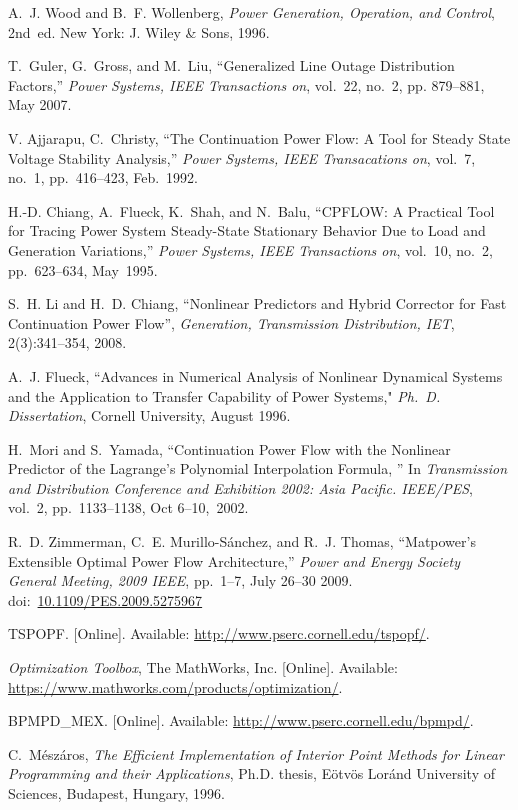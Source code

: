 \documentclass[12pt]{article}
\newcommand{\matpower}[0]{{\sc Matpower}}
\newcommand{\doi}[1]{doi:~\href{https://doi.org/#1}{#1}}
\numberwithin{equation}{section}
\numberwithin{table}{section}
\numberwithin{figure}{section}
\begin{document}
\begin{thebibliography}{99}
A.~J. Wood and B.~F. Wollenberg, \emph{Power Generation, Operation, and
  Control}, 2nd~ed. New York: J. Wiley \& Sons, 1996.

T.~Guler, G.~Gross, and M.~Liu, ``Generalized Line Outage Distribution
  Factors,'' \emph{Power Systems, IEEE Transactions on}, vol.~22, no.~2, pp.
  879--881, May 2007.

V. Ajjarapu, C.~Christy, ``The Continuation Power Flow: A Tool for Steady State Voltage Stability Analysis,'' \emph{Power Systems, IEEE Transacations on}, vol.~7, no.~1, pp.~416--423, Feb.~1992.

H.-D. Chiang, A.~Flueck, K.~Shah, and N.~Balu, ``CPFLOW:  A Practical Tool for Tracing Power System Steady-State Stationary Behavior Due to Load and Generation Variations,'' \emph{Power Systems, IEEE Transactions on}, vol.~10, no.~2, pp.~623--634, May~1995.

S.~H. Li and H.~D. Chiang, ``Nonlinear Predictors and Hybrid Corrector for Fast Continuation Power Flow'', {\em Generation, Transmission Distribution, IET}, 2(3):341--354, 2008.

A.~J. Flueck, ``Advances in Numerical Analysis of Nonlinear Dynamical Systems and the Application to Transfer Capability of Power Systems," \emph{Ph.~D. Dissertation}, Cornell University, August 1996.

H.~Mori and S.~Yamada, ``Continuation Power Flow with the Nonlinear Predictor of the Lagrange's Polynomial Interpolation Formula, '' In {\em Transmission and Distribution Conference and Exhibition 2002:
  Asia Pacific. IEEE/PES}, vol.~2, pp.~1133--1138, Oct 6--10,~2002.

R.~D. Zimmerman, C.~E. Murillo-S{\'a}nchez, and R.~J. Thomas, ``\matpower{}'s
  Extensible Optimal Power Flow Architecture,'' \emph{Power and Energy Society
  General Meeting, 2009 IEEE}, pp.~1--7, July 26--30 2009.
  \doi{10.1109/PES.2009.5275967}

TSPOPF. [Online]. Available: \url{http://www.pserc.cornell.edu/tspopf/}.

\emph{Optimization Toolbox}, The MathWorks, Inc.
  [Online]. Available: \url{https://www.mathworks.com/products/optimization/}.

BPMPD\_MEX. [Online]. Available:
  \url{http://www.pserc.cornell.edu/bpmpd/}.

C.~M{\'e}sz{\'a}ros, \emph{The Efficient Implementation of Interior Point Methods for Linear Programming and their Applications}, Ph.D. thesis,
  E{\"o}tv{\"o}s Lor{\'a}nd University of Sciences, Budapest, Hungary, 1996.


\end{thebibliography}
\end{document}
